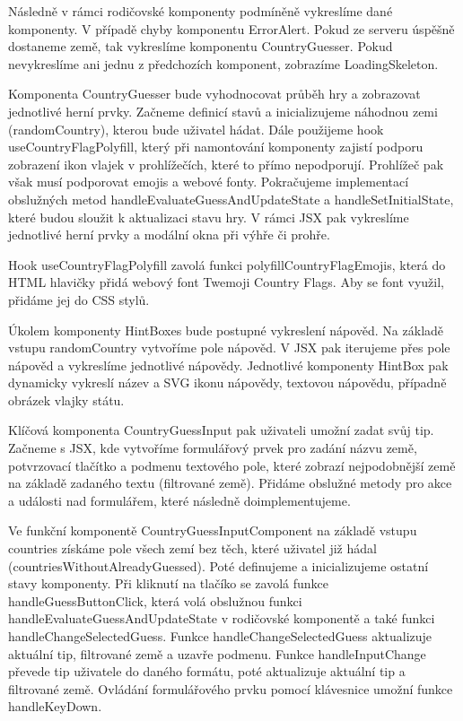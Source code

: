Následně v rámci rodičovské komponenty podmíněně vykreslíme dané komponenty. V případě chyby komponentu ErrorAlert. Pokud ze serveru úspěšně dostaneme země, tak vykreslíme komponentu CountryGuesser. 
Pokud nevykreslíme ani jednu z předchozích komponent, zobrazíme LoadingSkeleton.

Komponenta CountryGuesser bude vyhodnocovat průběh hry a zobrazovat jednotlivé herní prvky. Začneme definicí stavů a inicializujeme náhodnou zemi (randomCountry), kterou bude uživatel hádat. 
Dále použijeme hook useCountryFlagPolyfill, který při namontování komponenty zajistí podporu zobrazení ikon vlajek v prohlížečích, které to přímo nepodporují. 
Prohlížeč pak však musí podporovat emojis a webové fonty. Pokračujeme implementací obslužných metod handleEvaluateGuessAndUpdateState a handleSetInitialState, které budou sloužit k aktualizaci stavu hry. 
V rámci JSX pak vykreslíme jednotlivé herní prvky a modální okna při výhře či prohře.

Hook useCountryFlagPolyfill zavolá funkci polyfillCountryFlagEmojis, která do HTML hlavičky přidá webový font Twemoji Country Flags. Aby se font využil, přidáme jej do CSS stylů.

Úkolem komponenty HintBoxes bude postupné vykreslení nápověd. Na základě vstupu randomCountry vytvoříme pole nápověd. V JSX pak iterujeme přes pole nápověd a vykreslíme jednotlivé nápovědy. 
Jednotlivé komponenty HintBox pak dynamicky vykreslí název a SVG ikonu nápovědy, textovou nápovědu, případně obrázek vlajky státu.

Klíčová komponenta CountryGuessInput pak uživateli umožní zadat svůj tip. 
Začneme s JSX, kde vytvoříme formulářový prvek pro zadání názvu země, potvrzovací tlačítko a podmenu textového pole, které zobrazí nejpodobnější země na základě zadaného textu (filtrované země). 
Přidáme obslužné metody pro akce a události nad formulářem, které následně doimplementujeme.

Ve funkční komponentě CountryGuessInputComponent na základě vstupu countries získáme pole všech zemí bez těch, které uživatel již hádal (countriesWithoutAlreadyGuessed). 
Poté definujeme a inicializujeme ostatní stavy komponenty. 
Při kliknutí na tlačíko se zavolá funkce handleGuessButtonClick, která volá obslužnou funkci handleEvaluateGuessAndUpdateState v rodičovské komponentě a také funkci handleChangeSelectedGuess. 
Funkce handleChangeSelectedGuess aktualizuje aktuální tip, filtrované země a uzavře podmenu. Funkce handleInputChange převede tip uživatele do daného formátu, poté aktualizuje aktuální tip a filtrované země. 
Ovládání formulářového prvku pomocí klávesnice umožní funkce handleKeyDown.

